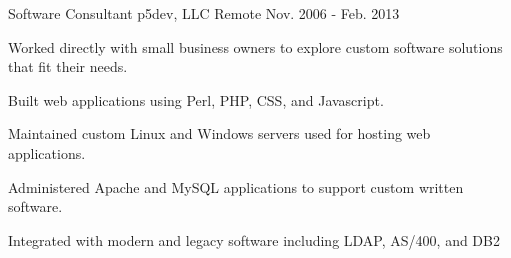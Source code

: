 \begin{cventries}
  \cventry
    {Software Consultant} %
    {p5dev, LLC} %
    {Remote} %
    {Nov. 2006 - Feb. 2013} %
    {
      \begin{cvitems} %
        \item {Worked directly with small business owners to explore custom software solutions that fit their needs.}
        \item {Built web applications using Perl, PHP, CSS, and Javascript.}
        \item {Maintained custom Linux and Windows servers used for hosting web applications.}
        \item {Administered Apache and MySQL applications to support custom written software.}
        \item {Integrated with modern and legacy software including LDAP, AS/400, and DB2}
      \end{cvitems}
    }

\end{cventries}
